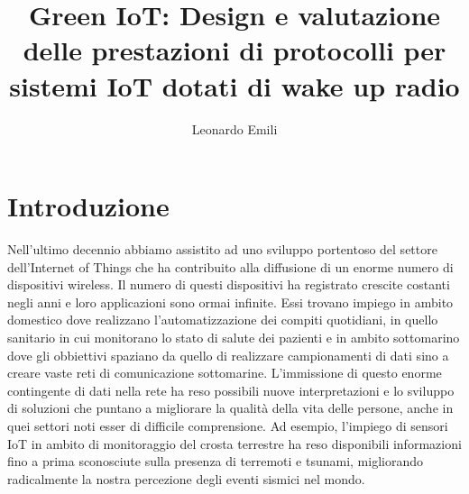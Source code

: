 \documentclass[binding=0.6cm,TFA]{sapthesis}
\title{Green IoT: Design e valutazione delle prestazioni di protocolli per sistemi IoT dotati di wake up radio}
\author{Leonardo Emili}
\begin{document}
\large

\frontmatter
\maketitle

\tableofcontents

\mainmatter
\chapter{Introduzione}

Nell'ultimo decennio abbiamo assistito ad uno sviluppo portentoso del settore dell'Internet of Things che ha contribuito alla diffusione
di un enorme numero di dispositivi wireless. Il numero di questi dispositivi ha registrato crescite costanti negli anni e loro applicazioni sono ormai infinite.
Essi trovano impiego in ambito domestico dove realizzano l'automatizzazione dei compiti quotidiani, in quello sanitario in cui monitorano lo stato di salute
dei pazienti e in ambito sottomarino dove gli obbiettivi spaziano da quello di realizzare campionamenti di dati sino a creare vaste reti di comunicazione sottomarine.
L'immissione di questo enorme contingente di dati nella rete ha reso possibili nuove interpretazioni e lo sviluppo di soluzioni che puntano a
migliorare la qualità della vita delle persone, anche in quei settori noti esser di difficile comprensione. Ad esempio, l'impiego di sensori IoT in ambito di
monitoraggio del crosta terrestre ha reso disponibili informazioni fino a prima sconosciute sulla presenza di terremoti e tsunami, migliorando radicalmente
la nostra percezione degli eventi sismici nel mondo.\\
\end{document}
